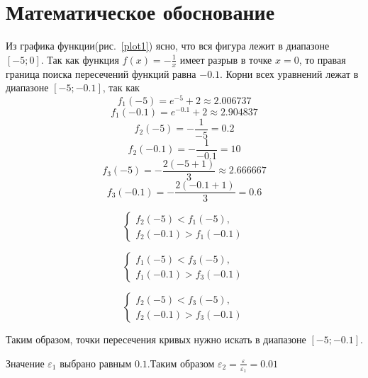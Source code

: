 \documentclass[a4paper,12pt,titlepage,finall]{article}
\begin{document}
\section{Математическое обоснование}

Из графика функции(рис.~\ref{plot1}) ясно, что вся фигура лежит в диапазоне $[-5; 0]$. Так как функция $f(x) = -\frac{1}{x}$ имеет разрыв в точке $x = 0$, то правая граница поиска пересечений функций равна $-0.1$. Корни всех уравнений лежат в диапазоне $[-5; -0.1]$, так как  
$$f_{1}(-5) = e^{-5}+2 \approx 2.006737 $$
$$f_{1}(-0.1) = e^{-0.1}+2 \approx 2.904837 $$
$$f_{2}(-5) = -\frac{1}{-5} = 0.2 $$
$$f_{2}(-0.1) = -\frac{1}{-0.1} = 10 $$
$$f_{3}(-5) = -\frac{2(-5+1)}{3} \approx 2.666667 $$
$$f_{3}(-0.1) = -\frac{2(-0.1+1)}{3} = 0.6 $$

\begin{equation}
 \begin{cases}
   f_{2}(-5) < f_{1}(-5), \\
   f_{2}(-0.1) > f_{1}(-0.1) 
 \end{cases}
\end{equation}

\begin{equation}
 \begin{cases}
   f_{1}(-5) < f_{3}(-5), \\
   f_{1}(-0.1) > f_{3}(-0.1) 
 \end{cases}
\end{equation}

\begin{equation}
 \begin{cases}
   f_{2}(-5) < f_{3}(-5), \\
   f_{2}(-0.1) > f_{3}(-0.1) 
 \end{cases}
\end{equation}

Таким образом, точки пересечения кривых нужно искать в диапазоне $[-5; -0.1]$.\par

Значение $\varepsilon_1$ выбрано равным $0.1$.Таким образом $\varepsilon_2 = \frac{\varepsilon}{\varepsilon_1} = 0.01$ 
\end{document}

